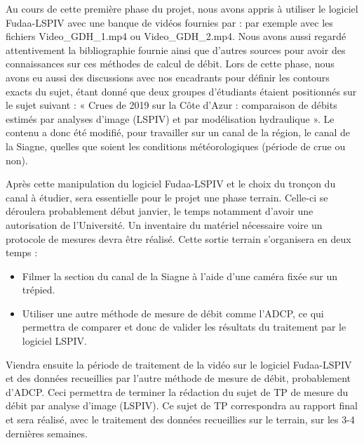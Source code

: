 \documentclass[
]{article}
\begin{document}
Au cours de cette première phase du projet, nous avons appris à utiliser le logiciel Fudaa-LSPIV avec une banque de vidéos fournies par \citep{noauthor_lirstea_nodate}: par exemple avec les fichiers Video\_GDH\_1.mp4 ou Video\_GDH\_2.mp4. Nous avons aussi regardé attentivement la bibliographie fournie ainsi que d'autres sources pour avoir des connaissances sur ces méthodes de calcul de débit. Lors de cette phase, nous avons eu aussi des discussions avec nos encadrants pour définir les contours exacts du sujet, étant donné que deux groupes d'étudiants étaient positionnés sur le sujet suivant : « Crues de 2019 sur la Côte d'Azur : comparaison de débits estimés par analyses d'image (LSPIV) et par modélisation hydraulique ». Le contenu a donc été modifié, pour travailler sur un canal de la région, le canal de la Siagne, quelles que soient les conditions météorologiques (période de crue ou non).

Après cette manipulation du logiciel Fudaa-LSPIV et le choix du tronçon du canal à étudier, sera essentielle pour le projet une phase terrain. Celle-ci se déroulera probablement début janvier, le temps notamment d'avoir une autorisation de l'Université. Un inventaire du matériel nécessaire voire un protocole de mesures devra être réalisé. Cette sortie terrain s'organisera en deux temps :

\begin{itemize}
\item
  Filmer la section du canal de la Siagne à l'aide d'une caméra fixée sur un trépied.
\item
  Utiliser une autre méthode de mesure de débit comme l'ADCP, ce qui permettra de comparer et donc de valider les résultats du traitement par le logiciel LSPIV.
\end{itemize}

Viendra ensuite la période de traitement de la vidéo sur le logiciel Fudaa-LSPIV et des données recueillies par l'autre méthode de mesure de débit, probablement d'ADCP. Ceci permettra de terminer la rédaction du sujet de TP de mesure du débit par analyse d'image (LSPIV). Ce sujet de TP correspondra au rapport final et sera réalisé, avec le traitement des données recueillies sur le terrain, sur les 3-4 dernières semaines.

\newpage

  
\end{document}
